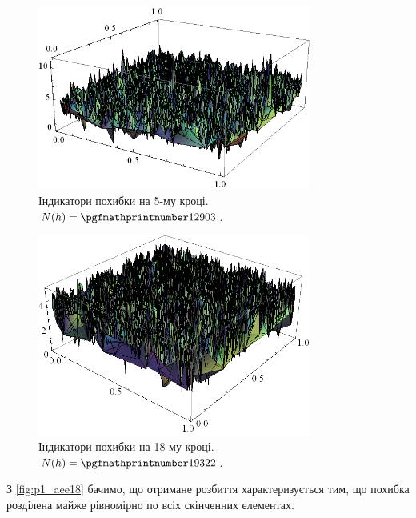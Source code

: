 \begin{figure}[H]
	\centering
    \includegraphics[width=0.8\textwidth]{problem1/my/AEE/5}
    \caption{Індикатори похибки на 5-му кроці.  $N(h) = \nn{12903}$.}
    \label{fig:p1_aee5}
\end{figure}

\begin{figure}[H]
	\centering
    \includegraphics[width=0.8\textwidth]{problem1/my/AEE/18}
    \caption{Індикатори похибки на 18-му кроці.  $N(h) = \nn{19322}$.}
    \label{fig:p1_aee18}
\end{figure}

З \autoref{fig:p1_aee18} бачимо, що отримане розбиття характеризується тим, що похибка розділена майже рівномірно по всіх скінченних елементах.

